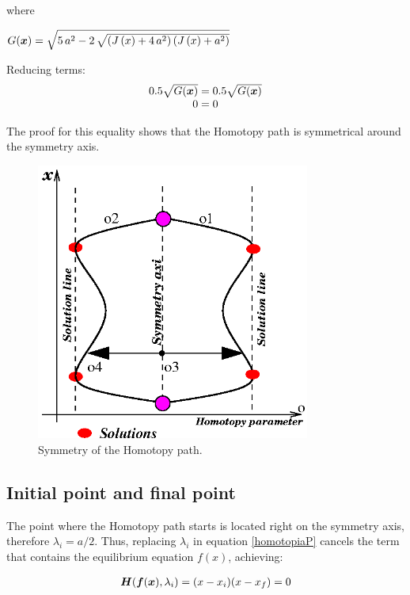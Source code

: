 \documentclass[conference,letterpaper,onecolumn]{IEEEtran}
\newcommand{\pig}[1]{\mbox{\boldmath ${#1}$}	}
\begin{document}
where {\small $G(\pig{x})=\sqrt {5\,{a}^{2}-2\,\sqrt { \left( J \left( x \right) +4 \,{a}^{2} \right)  \left( J \left( x \right) +{a}^{2} \right)}} $

Reducing terms:
\begin{displaymath}
\begin{array}{c}
0.5\sqrt{G(\pig{x})}=0.5\sqrt{G(\pig{x})} \\
0=0
\end{array}
\end{displaymath}

The proof for this equality shows that the Homotopy path is symmetrical around the symmetry axis.

{
\tiny
\begin{figure}[hbtp]
\centering
\includegraphics[width=9cm]{figs/simetria.eps}
\caption{Symmetry of the Homotopy path.}
\label{simetria}
\end{figure}
}

\subsection{Initial point and final point}

The point where the Homotopy path starts is located right on the symmetry axis, therefore $\lambda_i=a/2$. Thus, replacing $\lambda_i$ in equation \ref{homotopiaP} cancels the term that contains the equilibrium equation $f(x)$, achieving:

\begin{displaymath}
\begin{array}{r}
\pig{H}(\pig{f}(\pig{x}),\lambda_i )=(x-x_i)(x-x_f)=0  \\
\end{array}
\end{displaymath}

}
\end{document}
